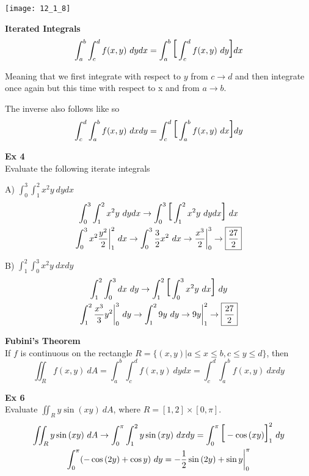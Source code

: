 \documentclass{article}
\begin{document}
 \begin{center}
   \texttt{[image: 12\_1\_8]}
 \end{center}

 \textbf{Iterated Integrals}
 \[
   \int^{b}_{a} \int^{d}_{c} f(x,y) ~dydx = \int^{b}_{a} \text{\huge{[}} \int^{d}_{c} f(x,y)~dy \text{\huge{]}}dx  
 \]

 Meaning that we first integrate with respect to $ y $ from $ c \to d $ and then integrate once again but this time with respect to x and from $ a \to b $.

 The inverse also follows like so
 \[
  \int^{d}_{c} \int^{b}_{a} f(x,y) ~dxdy = \int^{d}_{c} \text{\huge{[}} \int^{b}_{a} f(x,y)~dx \text{\huge{]}}dy 
 \]

 \textbf{Ex 4}\\
 Evaluate the following iterate integrals

 A) $ \int^{3}_{0} \int^{2}_{1} x^{2}y ~dydx$ 
 \[
   \begin{gathered}
     \int^{3}_{0} \int^{2}_{1} x^{2}y ~dydx \to \int^{3}_{0} \text{\huge{[}} \int^{2}_{1} x^{2}y~dydx \text{\huge{]}} ~dx\\
     \int^{3}_{0} x^{2}\frac{y^{2}}{2} \bigg|^{2}_{1}~dx \to \int^{3}_{0} \frac{3}{2}x^{2}~dx \to \frac{x^{3}}{2} \bigg|^{3}_0 \to \boxed{\frac{27}{2}}
   \end{gathered}
 \]
 
 B) $ \int^{2}_{1} \int^{3}_{0} x^{2}y ~ dxdy $
 \[
   \begin{gathered}
   \int^{2}_{1} \int^{3}_{0} dx~dy \to \int^{2}_{1} \text{\huge{[}} \int^{3}_{0} x^{2}y~dx \text{\huge{]}} ~dy\\
   \int^{2}_{1} \frac{x^{3}}{3}y^{2} \bigg|^{3}_0~dy \to \int^{2}_{1} 9y~dy \to 9y \bigg|^{2}_1 \to \boxed{\frac{27}{2}}
   \end{gathered}
 \]

 \textbf{Fubini's Theorem}\\
 If $ f $ is continuous on the rectangle $ R= \{ (x,y) | a \le x \le b, c \le y \le d \} $, then
 \[
   \iint_R f(x,y)~dA = \int^{b}_{a} \int^{d}_{c} f(x,y) ~dydx = \int^{d}_{c} \int^{b}_{a}f(x,y) ~ dxdy
 \]

 \textbf{Ex 6}\\
 Evaluate $ \iint_R y\sin{(xy)}~dA $, where $ R = [1,2] \times [0,\pi] $.
 \[
   \begin{gathered}
   \iint_R y\sin{(xy)}~dA \to \int^{\pi}_{0} \int^{2}_{1} y\sin{(xy)} ~dxdy = \int^{\pi}_{0} \text{\huge{[}} -\cos{(xy)} \text{\huge{]}}^{2}_1~dy\\
   \int^{\pi}_{0} (-\cos{(2y)}+\cos{y})~dy = -\frac{1}{2} \sin{(2y)}+\sin{y} \bigg|^{\pi}_0
   \end{gathered}
 \]
\end{document}
